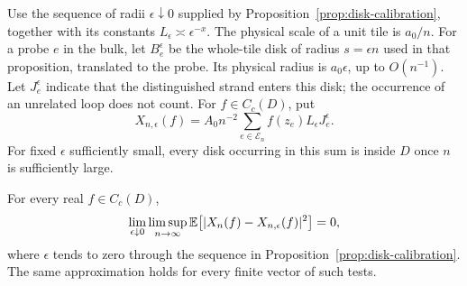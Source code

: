 Use the sequence of radii $\epsilon\downarrow0$ supplied by
Proposition~\ref{prop:disk-calibration}, together with its constants
$L_\epsilon\asymp\epsilon^{-x}$.  The physical scale of a unit tile is
$a_0/n$.  For a probe $e$ in the bulk, let $B_e^\epsilon$ be the
whole-tile disk of radius $s=\epsilon n$ used in that proposition,
translated to the probe.  Its physical radius is $a_0\epsilon$, up to
$O(n^{-1})$.  Let $J_e^\epsilon$ indicate that the distinguished strand
enters this disk; the occurrence of an unrelated loop does not count.
For $f\in C_c(D)$, put
\begin{equation}
 X_{n,\epsilon}(f)
   =A_0n^{-2}\sum_{e\in\mathcal E_n}f(z_e)L_\epsilon J_e^\epsilon.
 \label{eq:disk-test}
\end{equation}
For fixed $\epsilon$ sufficiently small, every disk occurring in this
sum is inside $D$ once $n$ is sufficiently large.

\begin{proposition}
\label{prop:l2-replacement}
For every real $f\in C_c(D)$,
\begin{equation}
 \lim_{\epsilon\downarrow0}\limsup_{n\to\infty}
 \mathbb E\bigl[|X_n(f)-X_{n,\epsilon}(f)|^2\bigr]=0,
 \label{eq:l2-replacement}
\end{equation}
where $\epsilon$ tends to zero through the sequence in
Proposition~\ref{prop:disk-calibration}.  The same approximation holds
for every finite vector of such tests.
\end{proposition}

